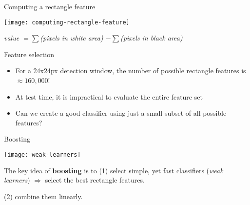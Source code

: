 \documentclass[compress]{beamer}
\begin{document}
\begin{frame}{Computing a rectangle feature}
    \begin{center}
        \texttt{[image: computing-rectangle-feature]}
    \end{center}

    \emph{value $= \sum$(pixels in white area) $- \sum$(pixels in black area)}
\end{frame}


\begin{frame}{Feature selection}

\pause
\begin{itemize}
\item  For a 24x24px detection window, the number of possible rectangle
  features is $\approx160,000$!
\item At test time, it is impractical to evaluate the entire feature set
\item Can we create a good classifier using just a small subset of all
  possible features?

\end{itemize}

\end{frame}


\begin{frame}{Boosting}
    \begin{center}
        \texttt{[image: weak-learners]}
    \end{center}

    The key idea of {\bf boosting} is to (1) select simple, yet fast classifiers
    (\emph{weak learners}) $\Rightarrow$ select the best rectangle features.

    (2) combine them linearly.

\end{frame}
\end{document}
